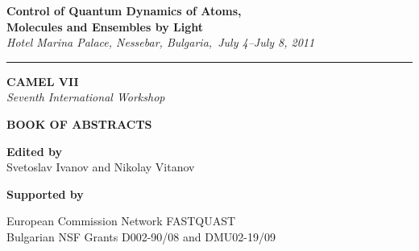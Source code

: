 \thispagestyle{empty}



\begin{center}

 {\LARGE \textsf{\textbf{Control of Quantum Dynamics of Atoms,}\\ \vspace{2mm} \textbf{Molecules and Ensembles by Light} }}\\ \vspace{2mm}
{\Large \emph{Hotel Marina Palace, Nessebar, Bulgaria,\ July 4--July 8, 2011}}

 \vspace{3mm}

\hrule

\vspace{25mm}

{\fontsize{40}{48}\selectfont \textsf{\textbf{CAMEL VII}}}\\
\vspace{5mm}
{\LARGE \emph{Seventh International Workshop}}\\

\vspace{25mm}

{\fontsize{36}{40}\selectfont \textsf{\textbf{BOOK OF  ABSTRACTS}}}\\

\vspace{15mm}

\Large{\textbf{Edited by} \\ Svetoslav Ivanov and Nikolay Vitanov}

\vspace{60mm}

{\Large \textbf{Supported by}

European Commission Network FASTQUAST\\
Bulgarian NSF Grants D002-90/08 and DMU02-19/09

}




\end{center}

